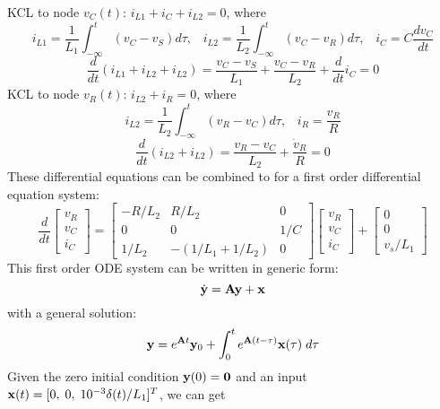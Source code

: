 \documentclass{article}
\begin{document}
KCL to node $v_C(t)$: $i_{L1}+i_C+i_{L2}=0$, where
\begin{equation}
  i_{L1}=\frac{1}{L_1}\int_{-\infty}^t (v_C-v_S)d\tau,\;\;\;
  i_{L2}=\frac{1}{L_2}\int_{-\infty}^t (v_C-v_R)d\tau,\;\;\;
  i_C=C\frac{dv_C}{dt}
\end{equation}
\begin{equation}
  \frac{d}{dt}(i_{L1}+i_{L2}+i_{L2})
  =\frac{v_C-v_S}{L_1}+\frac{v_C-v_R}{L_2}+\frac{d}{dt}i_C=0
\end{equation}
KCL to node $v_R(t)$: $i_{L2}+i_R=0$, where
\begin{equation}
  i_{L2}=\frac{1}{L_2}\int_{-\infty}^t (v_R-v_C)d\tau,\;\;\;
  i_R=\frac{v_R}{R}
\end{equation}
\begin{equation}
  \frac{d}{dt}(i_{L2}+i_{L2})=\frac{v_R-v_C}{L_2}+\frac{\dot{v}_R}{R}=0
\end{equation}
These differential equations can be combined to for a first
order differential equation system:
\begin{equation}
  \frac{d}{dt}\left[\begin{array}{c}v_R\\v_C\\i_C\end{array}\right]
  =\left[\begin{array}{ccc}-R/L_2&R/L_2&0\\0 & 0 & 1/C\\1/L_2&-(1/L_1+1/L_2)&0
    \end{array}\right]
  \left[\begin{array}{c}v_R\\v_C\\i_C\end{array}\right]
  +\left[\begin{array}{c}0\\0\\v_s/L_1\end{array}\right]
\end{equation}
This first order ODE system can be written in generic form:
\begin{equation}
  \dot{\bf y}={\bf Ay}+{\bf x}
\end{equation}
with a general solution:
\begin{equation}
  {\bf y}=e^{{\bf A}t}{\bf y}_0+\int_0^t e^{{\bf A}(t-\tau)} {\bf x}(\tau)\;d\tau
\end{equation}
Given the zero initial condition ${\bf y}(0)={\bf 0}$ and an
input ${\bf x}(t)=[0,\;0,\;10^{-3}\delta(t)/L_1]^T$, we can get 
\end{document}
